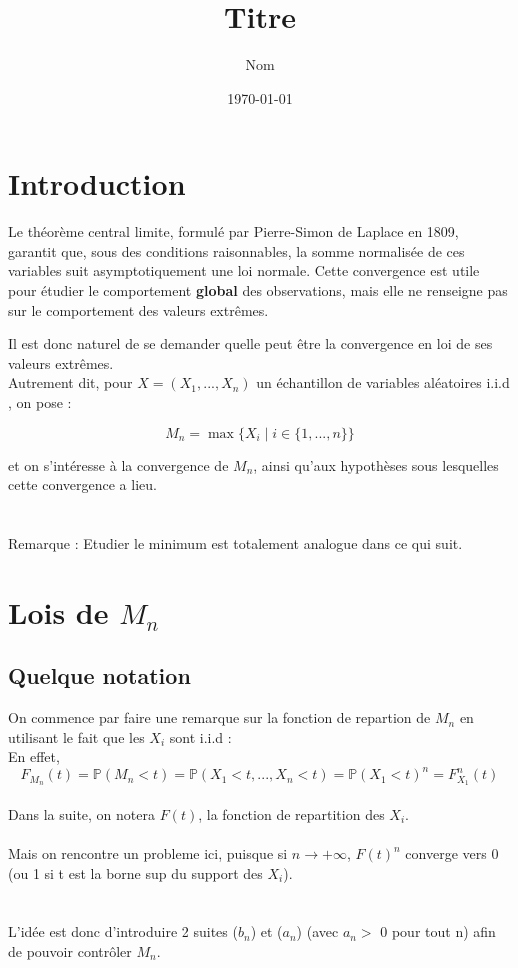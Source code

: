 \documentclass{article}
\title{Titre}
\author{Nom}
\date{\today}
\begin{document}
\maketitle 
\newpage
\section{Introduction} 

Le théorème central limite, formulé par Pierre-Simon de Laplace en 1809, garantit que, sous des conditions raisonnables, la somme normalisée de ces variables suit asymptotiquement une loi normale. Cette convergence est utile pour étudier le comportement \textbf{global} des observations, mais elle ne renseigne pas sur le comportement des valeurs extrêmes.

Il est donc naturel de se demander quelle peut être la convergence en loi de ses valeurs extrêmes. 
\\
Autrement dit, pour \( X = (X_1, ..., X_n) \) un échantillon de variables aléatoires i.i.d , on pose :


\[
M_n = \max\{X_i \mid i \in \{1, ..., n\} \}
\]

et on s'intéresse à la convergence de \( M_n \), ainsi qu'aux hypothèses sous lesquelles cette convergence a lieu.
\\
\\
\\
Remarque : Etudier le minimum est totalement analogue dans ce qui suit.

\section{Lois de $M_n$}

\subsection{Quelque notation }

On commence par faire une remarque sur la fonction de repartion de $M_n$ en utilisant le fait que les $X_i$ sont i.i.d :
\\
En effet,
\[
F_{M_n}(t) = \mathbb{P}(M_n < t) = \mathbb{P}(X_1 < t,...,X_n <t)=\mathbb{P}(X_1<t)^n = F_{X_1}^n(t) 
\]
\\
Dans la suite, on notera $F(t)$, la fonction de repartition des $X_i$.
\\
\\
Mais on rencontre un probleme ici, puisque si $n\to + \infty$, $F(t)^n$ converge vers 0 (ou 1 si t est la borne sup du support des $X_i$).
\\
\\
\\
L'idée est donc d'introduire 2 suites ($b_n$) et ($a_n$) (avec $a_n > $  0 pour tout n) afin de pouvoir contrôler $M_n$.
\end{document}
